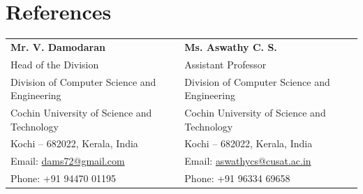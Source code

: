 \documentclass[10pt,a4paper]{extarticle}
\begin{document}
\section{References}
\begin{tabularx}{\textwidth}{@{}X X@{}}
  \textbf{Mr. V. Damodaran} & \textbf{Ms. Aswathy C. S.}\\
  Head of the Division & Assistant Professor\\
  Division of Computer Science and Engineering & Division of Computer Science and Engineering\\
  Cochin University of Science and Technology & Cochin University of Science and Technology\\
  Kochi -- 682022, Kerala, India & Kochi -- 682022, Kerala, India\\
  Email: \href{mailto:dams72@gmail.com}{dams72@gmail.com} & Email: \href{mailto:aswathycs@cusat.ac.in}{aswathycs@cusat.ac.in}\\
  Phone: +91 94470 01195 & Phone: +91 96334 69658
\end{tabularx}
\end{document}
